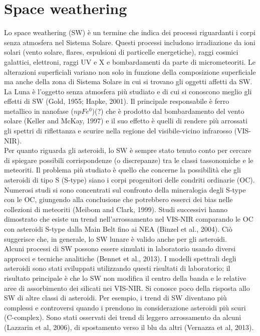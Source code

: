 \documentclass[a4paper,11pt,openright]{book}
\begin{document}
\section{Space weathering}
Lo space weathering (SW) è un termine che indica dei processi riguardanti i corpi senza atmosfera nel Sistema Solare. Questi processi includono irradiazione da ioni solari (vento solare, flares, espulsioni di particelle energetiche), raggi cosmici galattici, elettroni, raggi UV e X e bombardamenti da parte di micrometeoriti. Le alterazioni superficiali variano non solo in funzione della composizione superficiale ma anche della zona di Sistema Solare in cui si trovano gli oggetti affetti da SW.\\
La Luna è l'oggetto senza atmosfera più studiato e di cui si conoscono meglio gli effetti di SW (Gold, 1955; Hapke, 2001). Il principale responsabile è ferro metallico in nanofase ($npFe^0$)(?) che è prodotto dal bombardamento del vento solare (Keller and McKay, 1997) e il suo effetto è quelli di rendere più arrossati gli spettri di riflettanza e scurire nella regione del visibile-vicino infrarosso (VIS-NIR).\\
Per quanto riguarda gli asteroidi, lo SW è sempre stato tenuto conto per cercare di spiegare possibili corrispondenze (o discrepanze) tra le classi tassonomiche e le meteoriti. Il problema più studiato è quello che concerne la possibilità che gli asteroidi di tipo S (S-type) siano i corpi progenitori delle condriti ordinarie (OC). Numerosi studi si sono concentrati sul confronto della mineralogia degli S-type con le OC, giungendo alla conclusione che potrebbero esserci dei bias nelle collezioni di meteoriti (Meibom and Clark, 1999). Studi successivi hanno dimostrato che esiste un trend nell'arrossamento nel VIS-NIR comparando le OC con asteroidi S-type dalla Main Belt fino ai NEA (Binzel et al., 2004). Ciò suggerisce che, in generale, lo SW lunare è valido anche per gli asteroidi.\\
Alcuni processi di SW possono essere simulati in laboratorio usando diversi approcci e tecniche analitiche (Bennet et al., 2013). I modelli spettrali degli asteroidi sono stati sviluppati utilizzando questi risultati di laboratorio; il risultato principale è che lo SW non modifica il centro della banda e le relative aree di assorbimento dei silicati nei VIS-NIR. Si conosce poco della risposta allo SW di altre classi di asteroidi. Per esempio, i trend di SW diventano più complessi e controversi quando i prendono in considerazione asteroidi più scuri (C-complex). Sono stati osservati dei trend di leggero arrossamento da alcuni (Lazzarin et al, 2006), di spostamento verso il blu da altri (Vernazza et al, 2013).
\end{document}
